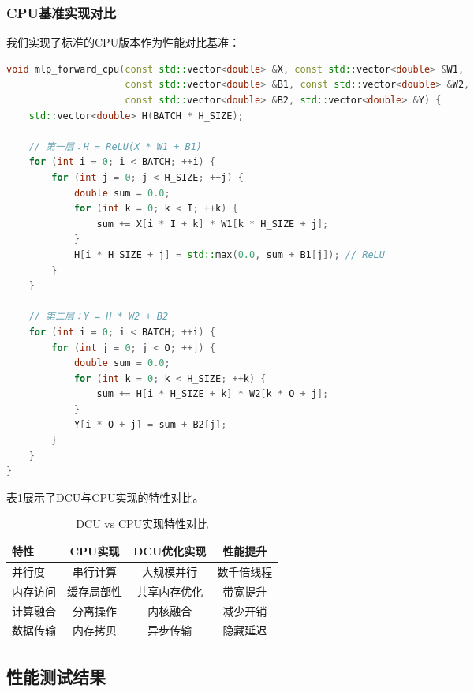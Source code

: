 \documentclass[12pt,a4paper]{article}
\begin{document}
\subsubsection{CPU基准实现对比}

我们实现了标准的CPU版本作为性能对比基准：

\begin{lstlisting}[language=c++,caption=CPU基准实现]
void mlp_forward_cpu(const std::vector<double> &X, const std::vector<double> &W1,
                     const std::vector<double> &B1, const std::vector<double> &W2,
                     const std::vector<double> &B2, std::vector<double> &Y) {
    std::vector<double> H(BATCH * H_SIZE);

    // 第一层：H = ReLU(X * W1 + B1)
    for (int i = 0; i < BATCH; ++i) {
        for (int j = 0; j < H_SIZE; ++j) {
            double sum = 0.0;
            for (int k = 0; k < I; ++k) {
                sum += X[i * I + k] * W1[k * H_SIZE + j];
            }
            H[i * H_SIZE + j] = std::max(0.0, sum + B1[j]); // ReLU
        }
    }

    // 第二层：Y = H * W2 + B2
    for (int i = 0; i < BATCH; ++i) {
        for (int j = 0; j < O; ++j) {
            double sum = 0.0;
            for (int k = 0; k < H_SIZE; ++k) {
                sum += H[i * H_SIZE + k] * W2[k * O + j];
            }
            Y[i * O + j] = sum + B2[j];
        }
    }
}
\end{lstlisting}

表\ref{tab:cpu_vs_dcu_features}展示了DCU与CPU实现的特性对比。

\begin{table}[H]
\centering
\caption{DCU vs CPU实现特性对比}
\label{tab:cpu_vs_dcu_features}
\begin{tabular}{lccc}
\toprule
特性 & CPU实现 & DCU优化实现 & 性能提升 \\
\midrule
并行度 & 串行计算 & 大规模并行 & 数千倍线程 \\
内存访问 & 缓存局部性 & 共享内存优化 & 带宽提升 \\
计算融合 & 分离操作 & 内核融合 & 减少开销 \\
数据传输 & 内存拷贝 & 异步传输 & 隐藏延迟 \\
\bottomrule
\end{tabular}
\end{table}

\subsection{性能测试结果}
\end{document}

